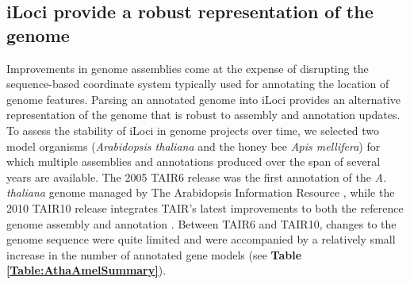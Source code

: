 \subsection*{iLoci provide a robust representation of the genome}

Improvements in genome assemblies come at the expense of disrupting the sequence-based coordinate system typically used for annotating the location of genome features.
Parsing an annotated genome into iLoci provides an alternative representation of the genome that is robust to assembly and annotation updates.
To assess the stability of iLoci in genome projects over time, we selected two model organisms (\textit{Arabidopsis thaliana} and the honey bee \textit{Apis mellifera}) for which multiple assemblies and annotations produced over the span of several years are available.
The 2005 TAIR6 release was the first annotation of the \textit{A. thaliana} genome managed by The Arabidopsis Information Resource \cite{TAIR}, while the 2010 TAIR10 release integrates TAIR's latest improvements to both the reference genome assembly and annotation \cite{TAIR10}.
Between TAIR6 and TAIR10, changes to the genome sequence were quite limited and were accompanied by a relatively small increase in the number of annotated gene models (see \textbf{Table \ref{Table:AthaAmelSummary}}).

